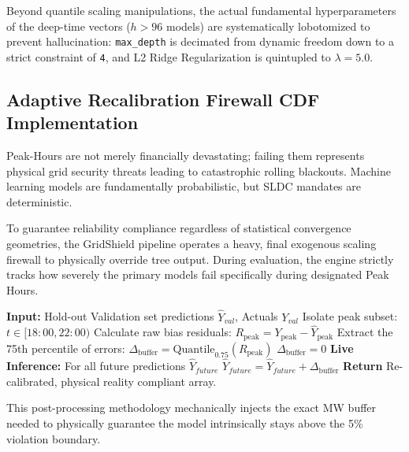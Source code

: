 \documentclass[11pt,a4paper]{article}
\begin{document}
Beyond quantile scaling manipulations, the actual fundamental hyperparameters of the deep-time vectors ($h > 96$ models) are systematically lobotomized to prevent hallucination: \texttt{max\_depth} is decimated from dynamic freedom down to a strict constraint of \texttt{4}, and L2 Ridge Regularization is quintupled to $\lambda = 5.0$.

\subsection{Adaptive Recalibration Firewall CDF Implementation}
Peak-Hours are not merely financially devastating; failing them represents physical grid security threats leading to catastrophic rolling blackouts. Machine learning models are fundamentally probabilistic, but SLDC mandates are deterministic.

To guarantee reliability compliance regardless of statistical convergence geometries, the GridShield pipeline operates a heavy, final exogenous scaling firewall to physically override tree output. During evaluation, the engine strictly tracks how severely the primary models fail specifically during designated Peak Hours.

\begin{algorithm}[H]
\caption{Peak-Hour Ex-Post Buffer Calculation Firewall}
\begin{algorithmic}[1]
\State \textbf{Input:} Hold-out Validation set predictions $\hat{Y}_{val}$, Actuals $Y_{val}$
\State Isolate peak subset: $t \in [18:00, 22:00)$
\State Calculate raw bias residuals: $R_{\text{peak}} = Y_{\text{peak}} - \hat{Y}_{\text{peak}}$
    \State Extract the 75th percentile of errors: $\Delta_{\text{buffer}} = \text{Quantile}_{0.75}(R_{\text{peak}})$
\Else
    \State $\Delta_{\text{buffer}} = 0$
\EndIf
\State \textbf{Live Inference:} For all future predictions $\hat{Y}_{future}$
\If {$time(\hat{Y}_{future}) \in [18:00, 22:00)$}
    \State $\hat{Y}_{future} = \hat{Y}_{future} + \Delta_{\text{buffer}}$
\EndIf
\State \textbf{Return} Re-calibrated, physical reality compliant array.
\end{algorithmic}
\end{algorithm}

This post-processing methodology mechanically injects the exact MW buffer needed to physically guarantee the model intrinsically stays above the 5\% violation boundary.


\end{document}
